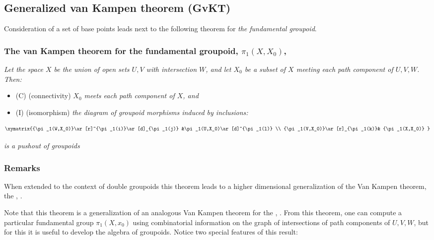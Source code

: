 \documentclass[12pt]{article}
\theoremstyle{plain}
\theoremstyle{definition}
\numberwithin{equation}{section}
\begin{document}
\subsection{Generalized van Kampen theorem (GvKT)} 

   Consideration of a set of base points leads next to the following theorem for \emph{the fundamental groupoid}.

\subsubsection{The van Kampen theorem for the fundamental groupoid, $\pi_1(X,X_0)$, \cite{BR67}}


  \emph{Let the space $X$ be the union of open sets $U,V$ with intersection $W$, and let $X_0$ 
be a subset of $X$ meeting each path component of $U,V,W$. Then:}

\begin{itemize}
\item (C) (connectivity)  {\em $X _0$ meets each path component of $X$, and}
\item (I) (isomorphism)  {\em the diagram of groupoid morphisms induced by inclusions:}
\end{itemize}

$$\xymatrix{{\pi_1(W,X_0)}\ar [r]^{\pi_1(i)}\ar[d]_{\pi_1(j)}
&\pi_1(U,X_0)\ar[d]^{\pi_1(l)} \\
{\pi_1(V,X_0)}\ar [r]_{\pi_1(k)}& {\pi_1(X,X_0)} }
$$

\emph{is a pushout of groupoids}
 
\subsubsection{Remarks}

 When extended to the context of double groupoids this theorem leads to a higher dimensional
generalization of the Van Kampen theorem, the ,
\cite{BHKP}. 

 Note that this theorem is a generalization of an analogous Van Kampen theorem for the 
, \cite{BR67, kampen1-1933}. From this theorem, one can compute a particular fundamental group $\pi_1(X,x_0)$ using combinatorial information on the graph of intersections of path 
components of $U,V,W$, but for this it is useful to develop the algebra of groupoids. Notice 
two special features of this result:
\end{document}

